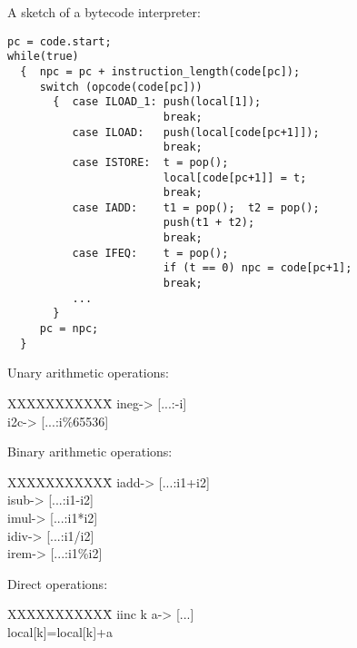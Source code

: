 \begin{slide*}
A sketch of a bytecode interpreter:\\

\begin{tt}
\begin{scriptsize}
\begin{verbatim}
pc = code.start;
while(true)
  {  npc = pc + instruction_length(code[pc]);
     switch (opcode(code[pc]))
       {  case ILOAD_1: push(local[1]);
                        break;
          case ILOAD:   push(local[code[pc+1]]);
                        break;
          case ISTORE:  t = pop();
                        local[code[pc+1]] = t;
                        break;
          case IADD:    t1 = pop();  t2 = pop();
                        push(t1 + t2);
                        break;
          case IFEQ:    t = pop();
                        if (t == 0) npc = code[pc+1];
                        break;
          ...
       }
     pc = npc;
  }
\end{verbatim}
\end{scriptsize}
\end{tt}
\vfil
\end{slide*}

\begin{slide*}
Unary arithmetic operations:\\

\begin{tt}
\begin{tabbing}
XXXXXXXXXXX\=\kill
ineg\>[...:i] -> [...:-i]\\
i2c\>[...:i] -> [...:i\%65536]\\
\end{tabbing}
\end{tt}

Binary arithmetic operations:\\
 
\begin{tt}
\begin{tabbing}
XXXXXXXXXXX\=\kill
iadd\>[...:i1:i2] -> [...:i1+i2]\\
isub\>[...:i1:i2] -> [...:i1-i2]\\
imul\>[...:i1:i2] -> [...:i1*i2]\\
idiv\>[...:i1:i2] -> [...:i1/i2]\\
irem\>[...:i1:t2] -> [...:i1\%i2]\\
\end{tabbing}
\end{tt}

Direct operations:\\

\begin{tt}
\begin{tabbing}
XXXXXXXXXXX\=\kill
iinc k a\>[...] -> [...]\\\>local[k]=local[k]+a\\
\end{tabbing}
\end{tt}
\vfil
\end{slide*}

